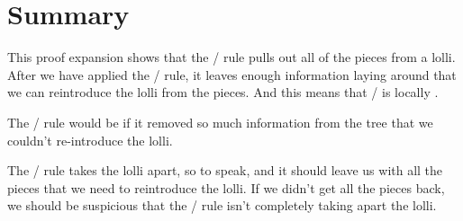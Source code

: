 \documentclass[../../../main.tex]{subfiles}
\begin{document}
\section{Summary}

This proof expansion shows that the \lolliElim/ rule pulls out all of the pieces from a lolli. After we have applied the \lolliElim/ rule, it leaves enough information laying around that we can reintroduce the lolli from the pieces. And this means that \lolliElim/ is locally .

The \lolliElim/ rule would be  if it removed so much information from the tree that we couldn't re-introduce the lolli. 

The \lolliElim/ rule takes the lolli apart, so to speak, and it should leave us with all the pieces that we need to reintroduce the lolli. If we didn't get all the pieces back, we should be suspicious that the \lolliElim/ rule isn't completely taking apart the lolli. 
\end{document}
